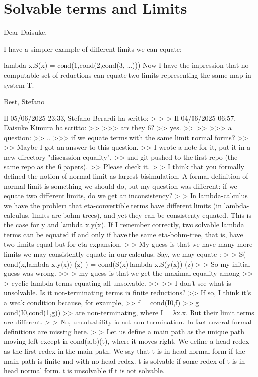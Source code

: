 \section{Solvable terms and Limits}




    Dear Daisuke,

    I have a simpler example of different limits we can equate:

lambda x.S(x)    =    cond(1,cond(2,cond(3, ...)))
    Now I have the impression that no computable set of reductions can equate two limits representing the same map in system T.

    Best, Stefano



Il 05/06/2025 23:33, Stefano Berardi ha scritto:
>
>
> Il 04/06/2025 06:57, Daisuke Kimura ha scritto:
>>
>>>  are they 6?
>> yes.
>>
>>
>>> a question:
>> ..
>>> if we equate terms with the same limit normal forms?
>>
>> Maybe I got an answer to this question.
>> I wrote a note for it, put it in a new directory "discussion-equality",
>> and git-pushed to the first repo (the same repo as the 6 papers).
>> Please check it.
>
>     I think that you formally defined the notion of normal limit as largest bisimulation. A formal definition of normal limit is something we should do, but my question was different: if we equate two different limits, do we get an inconsistency?
>
>     In lambda-calculus we have the problem that eta-convertible terms have different limits (in lambda-calculus, limits are bohm trees), and yet they can be consistenty equated. This is the case for y and lambda x.y(x). If I remember correctly, two solvable lambda terms can be equated if and only if have the same eta-bohm-tree, that is, have two limits equal but for eta-expansion.
>
>     My guess is that we have many more limits we may consistently equate in our calculus. Say, we may equate :
>
>  S( cond(x,lambda x.y(x)) (z) )    =    cond(S(x),lambda x.S(y(x)) (z)
>
>     So my initial guess was wrong.
>> > my guess is that we get the maximal equality among
>> > cyclic lambda terms equating all unsolvable.
>>
>> I don't see what is unsolvable. Is it non-terminating terms in finite reductions?
>> If so, I think it's a weak condition because, for example,
>> f = cond(I0,f)
>> g = cond(I0,cond(1,g))
>> are non-terminating, where I = λx.x. But their limit terms are different.
>
>     No, unsolvability is not non-termination. In fact several formal definitions are missing here.
>
>     Let us define a main path as the unique path moving left except in cond(a,b)(t), where it moves right. We define a head redex as the first redex in the main path. We say that t is in head normal form if the main path is finite and with no head redex. t is solvable if some redex of t is in head normal form. t is unsolvable if t is not solvable.

